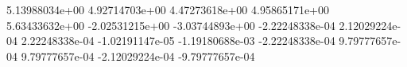  5.13988034e+00
 4.92714703e+00
 4.47273618e+00
 4.95865171e+00
 5.63433632e+00
 -2.02531215e+00
 -3.03744893e+00
 -2.22248338e-04
 2.12029224e-04
 2.22248338e-04
 -1.02191147e-05
 -1.19180688e-03
 -2.22248338e-04
 9.79777657e-04
 9.79777657e-04
 -2.12029224e-04
 -9.79777657e-04
